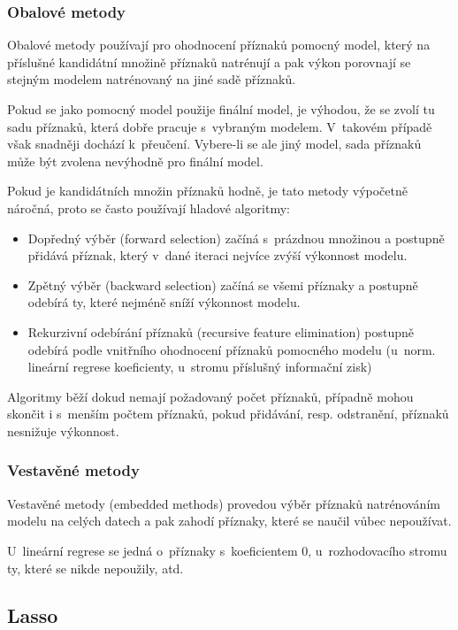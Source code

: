 \subsubsection{Obalové metody}

Obalové metody používají pro ohodnocení příznaků pomocný model, který na příslušné kandidátní množině příznaků natrénují a pak výkon porovnají se stejným modelem natrénovaný na jiné sadě příznaků.

Pokud se jako pomocný model použije finální model, je výhodou, že se zvolí tu sadu příznaků, která dobře pracuje s~vybraným modelem. V~takovém případě však snadněji dochází k~přeučení. Vybere-li se ale jiný model, sada příznaků může být zvolena nevýhodně pro finální model.

Pokud je kandidátních množin příznaků hodně, je tato metody výpočetně náročná, proto se často používají hladové algoritmy:
\begin{itemize}

    \item Dopředný výběr (forward selection) začíná s~prázdnou množinou a postupně přidává příznak, který v~dané iteraci nejvíce zvýší výkonnost modelu.

    \item Zpětný výběr (backward selection) začíná se všemi příznaky a postupně odebírá ty, které nejméně sníží výkonnost modelu.

    \item Rekurzivní odebírání příznaků (recursive feature elimination) postupně odebírá podle vnitřního ohodnocení příznaků pomocného modelu (u~norm. lineární regrese koeficienty, u~stromu příslušný informační zisk)

\end{itemize}
Algoritmy běží dokud nemají požadovaný počet příznaků, případně mohou skončit i s~menším počtem příznaků, pokud přidávání, resp. odstranění, příznaků nesnižuje výkonnost.

\subsubsection{Vestavěné metody}

Vestavěné metody (embedded methods) provedou výběr příznaků natrénováním modelu na celých datech a pak zahodí příznaky, které se naučil vůbec nepoužívat.

U~lineární regrese se jedná o~příznaky s~koeficientem 0, u~rozhodovacího stromu ty, které se nikde nepoužily, atd.

\subsection{Lasso} \label{sec:lasso}

